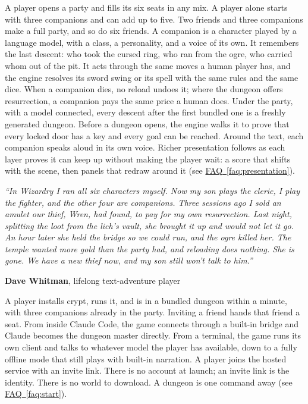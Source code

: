 \documentclass[11pt,letterpaper]{article}
\newcommand{\prsection}[1]{%
  \vspace{1em}{\large\bfseries\color{SectionBlue}#1}\vspace{0.3em}\par}
\newcommand{\faqref}[1]{\hyperref[#1]{FAQ~\ref*{#1}}}
\begin{document}
\prsection{Solution}

A player opens a party and fills its six seats in any mix. A player alone
starts with three companions and can add up to five. Two friends and three
companions make a full party, and so do six friends. A
companion is a character played by a language model, with a class, a
personality, and a voice of its own. It remembers the last descent: who took
the cursed ring, who ran from the ogre, who carried whom out of the pit. It
acts through the same moves a human player has, and the engine resolves its
sword swing or its spell with the same rules and the same dice. When a
companion dies, no reload undoes it; where the dungeon offers resurrection,
a companion pays the same price a human does. Under the party, with a model
connected, every descent after the first bundled one is a freshly generated
dungeon. Before a dungeon opens, the engine walks it to prove that
every locked door has a key and every goal can be reached. Around the text,
each companion speaks aloud in its own voice. Richer presentation follows as
each layer proves it can keep up without making the player wait: a score
that shifts with the scene, then panels that redraw around it
(see \faqref{faq:presentation}).

\prsection{Customer Quote}

\begin{customerquote}
\textit{``In Wizardry I ran all six characters myself. Now my son plays the
cleric, I play the fighter, and the other four are companions. Three
sessions ago I sold an amulet our thief, Wren, had found, to pay for my own
resurrection. Last night, splitting the loot from the lich's vault, she
brought it up and would not let it go. An hour later she held the bridge so
we could run, and the ogre killed her. The temple wanted more gold than the
party had, and reloading does nothing. She is gone. We have a new thief now,
and my son still won't talk to him.''}

\raggedleft \textbf{Dave Whitman}, lifelong text-adventure player
\end{customerquote}

\prsection{Getting Started}

A player installs crypt, runs it, and is in a bundled dungeon within a minute, with
three companions already in the party. Inviting a friend hands that
friend a seat. From inside Claude Code, the
game connects through a built-in bridge and Claude becomes the dungeon
master directly. From a terminal, the game runs its own client and talks to
whatever model the player has available, down to a fully offline mode that
still plays with built-in narration. A player joins the hosted service with
an invite link. There is no account at launch; an invite link is the
identity. There is no world to download. A dungeon is one command
away (see \faqref{faq:start}).
\end{document}
